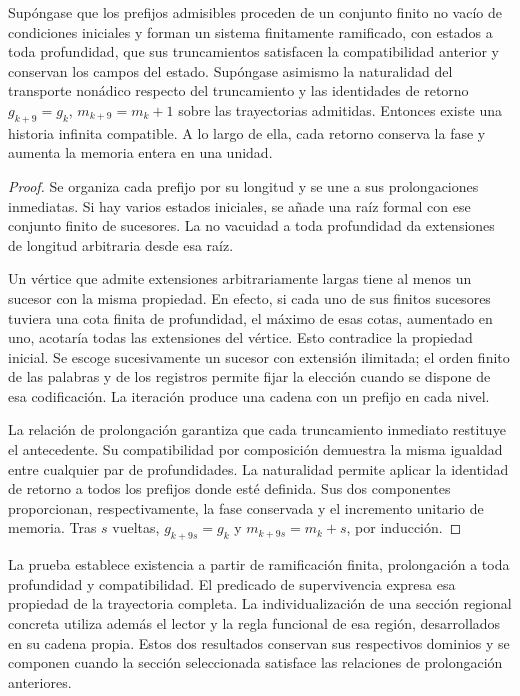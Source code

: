\begin{theorem}
Supóngase que los prefijos admisibles proceden de un conjunto finito
no vacío de condiciones iniciales y forman un sistema finitamente
ramificado, con estados a toda profundidad, que sus truncamientos
satisfacen la compatibilidad anterior y conservan los campos del estado.
Supóngase asimismo la naturalidad del transporte nonádico respecto del
truncamiento y las identidades de retorno $g_{k+9}=g_k$,
$m_{k+9}=m_k+1$ sobre las trayectorias admitidas. Entonces existe una
historia infinita compatible. A lo largo de ella, cada retorno conserva
la fase y aumenta la memoria entera en una unidad.
\end{theorem}
\begin{proof}
Se organiza cada prefijo por su longitud y se une a sus prolongaciones
inmediatas. Si hay varios estados iniciales, se añade una raíz formal
con ese conjunto finito de sucesores. La no vacuidad a toda profundidad
da extensiones de longitud arbitraria desde esa raíz.

Un vértice que admite extensiones arbitrariamente largas tiene al menos
un sucesor con la misma propiedad. En efecto, si cada uno de sus
finitos sucesores tuviera una cota finita de profundidad, el máximo de
esas cotas, aumentado en uno, acotaría todas las extensiones del
vértice. Esto contradice la propiedad inicial. Se escoge sucesivamente
un sucesor con extensión ilimitada; el orden finito de las palabras y
de los registros permite fijar la elección cuando se dispone de esa
codificación. La iteración produce una cadena con un prefijo en cada
nivel.

La relación de prolongación garantiza que cada truncamiento inmediato
restituye el antecedente. Su compatibilidad por composición demuestra
la misma igualdad entre cualquier par de profundidades. La naturalidad
permite aplicar la identidad de retorno a todos los prefijos donde esté
definida. Sus dos componentes proporcionan, respectivamente, la fase
conservada y el incremento unitario de memoria. Tras $s$ vueltas,
$g_{k+9s}=g_k$ y $m_{k+9s}=m_k+s$, por inducción.
\end{proof}

La prueba establece existencia a partir de ramificación finita,
prolongación a toda profundidad y compatibilidad. El predicado de
supervivencia expresa esa propiedad de la trayectoria completa. La
individualización de una sección regional concreta utiliza además el
lector y la regla funcional de esa región, desarrollados en su cadena
propia. Estos dos resultados conservan sus respectivos dominios y se
componen cuando la sección seleccionada satisface las relaciones de
prolongación anteriores.

